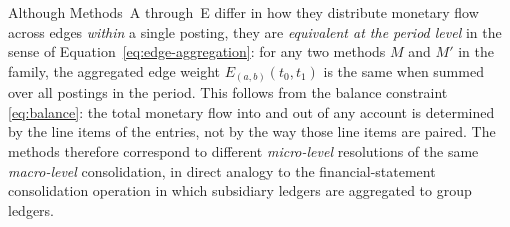 Although Methods~A through~E differ in how they distribute monetary
flow across edges \emph{within} a single posting, they are
\emph{equivalent at the period level} in the sense of
Equation~\eqref{eq:edge-aggregation}: for any two methods $M$ and
$M'$ in the family, the aggregated edge weight
$E_{(a,b)}(t_0, t_1)$ is the same when summed over all postings in
the period.  This follows from the balance constraint
\eqref{eq:balance}: the total monetary flow into and out of any
account is determined by the line items of the entries, not by
the way those line items are paired.  The methods therefore
correspond to different \emph{micro-level} resolutions of the same
\emph{macro-level} consolidation, in direct analogy to the
financial-statement consolidation operation in which subsidiary
ledgers are aggregated to group ledgers.
